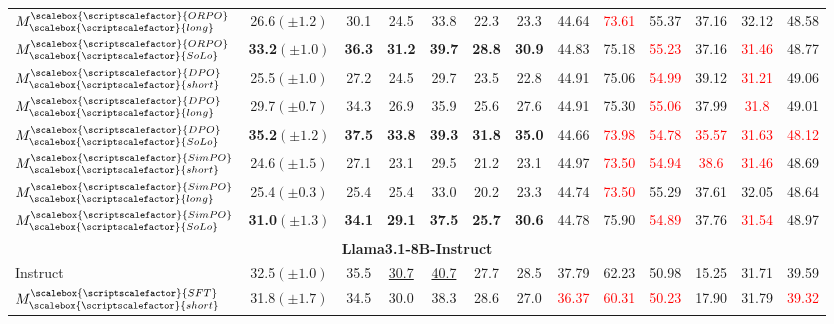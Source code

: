 \begin{table}[th]
\begin{tabular}{lcccccccccccc}
$M^{\scalebox{\scriptscalefactor}{ORPO}}_{\scalebox{\scriptscalefactor}{long}}$&{26.6}$({\pm1.2})$&{30.1}&{24.5}&{33.8}&{22.3}&{23.3}& 44.64 & \textcolor{red}{73.61} & 55.37 & 37.16 & 32.12 & 48.58 \\
\rowcolor{Gray}$M^{\scalebox{\scriptscalefactor}{ORPO}}_{\scalebox{\scriptscalefactor}{SoLo}}$&\textbf{33.2}$({\pm1.0})$&\textbf{36.3}&\textbf{31.2}&\textbf{39.7}&\textbf{28.8}&\textbf{30.9}& 44.83 & 75.18 & \textcolor{red}{55.23} & 37.16 & \textcolor{red}{31.46 } & 48.77 \\
\hdashline
$M^{\scalebox{\scriptscalefactor}{DPO}}_{\scalebox{\scriptscalefactor}{short}}$&{25.5}$(\pm1.0)$&{27.2}&{24.5}&{29.7}&{23.5}&{22.8}&44.91&75.06&\textcolor{red}{54.99}&39.12&\textcolor{red}{31.21}&49.06\\
$M^{\scalebox{\scriptscalefactor}{DPO}}_{\scalebox{\scriptscalefactor}{long}}$&29.7$(\pm0.7)$&34.3&{26.9}&{35.9}&25.6&27.6&44.91&75.30&\textcolor{red}{55.06}&37.99&\textcolor{red}{31.8}&49.01\\
\rowcolor{Gray}$M^{\scalebox{\scriptscalefactor}{DPO}}_{\scalebox{\scriptscalefactor}{SoLo}}$&\textbf{35.2}$(\pm1.2)$&\textbf{37.5}&\textbf{33.8}&\textbf{39.3}&\textbf{31.8}&\textbf{35.0}&44.66&\textcolor{red}{73.98}&\textcolor{red}{54.78}&\textcolor{red}{35.57}&\textcolor{red}{31.63}&\textcolor{red}{48.12}\\
\hdashline
$M^{\scalebox{\scriptscalefactor}{SimPO}}_{\scalebox{\scriptscalefactor}{short}}$&{24.6}$(\pm1.5)$&{27.1}&{23.1}&{29.5}&{21.2}&{23.1}&44.97&\textcolor{red}{73.50}&\textcolor{red}{54.94}&\textcolor{red}{38.6}&\textcolor{red}{31.46}&48.69\\
$M^{\scalebox{\scriptscalefactor}{SimPO}}_{\scalebox{\scriptscalefactor}{long}}$&{25.4}$(\pm0.3)$&{25.4}&{25.4}&{33.0}&{20.2}&{23.3}&44.74&\textcolor{red}{73.50}&55.29&37.61&32.05&48.64\\
\rowcolor{Gray}$M^{\scalebox{\scriptscalefactor}{SimPO}}_{\scalebox{\scriptscalefactor}{SoLo}}$&\textbf{31.0}$(\pm1.3)$&\textbf{34.1}&\textbf{29.1}&\textbf{37.5}&\textbf{25.7}&\textbf{30.6}&44.78&75.90&\textcolor{red}{54.89}&37.76&\textcolor{red}{31.54}&48.97\\
\midrule
\multicolumn{13}{c}{\textbf{Llama3.1-8B-Instruct}}\\
\midrule
Instruct&32.5$(\pm1.0)$&35.5&\underline{30.7}&\underline{40.7}&27.7&28.5&37.79 & 62.23 & 50.98 & 15.25 & 31.71 & 39.59 \\
$M^{\scalebox{\scriptscalefactor}{SFT}}_{\scalebox{\scriptscalefactor}{short}}$&31.8$(\pm1.7)$&34.5&30.0&38.3&28.6&27.0&\textcolor{red}{36.37} & \textcolor{red}{60.31} & \textcolor{red}{50.23} & 17.90 & 31.79 & \textcolor{red}{39.32 } \\

\end{tabular}
\end{table}
